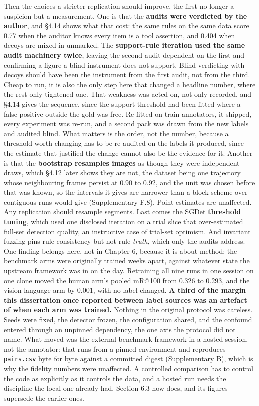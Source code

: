 Then the choices a stricter replication should improve, the first no longer a suspicion but a measurement. One is that the \textbf{audits were verdicted by the author}, and \S{}4.14 shows what that cost: the same rules on the same data score 0.77 when the auditor knows every item is a tool assertion, and 0.404 when decoys are mixed in unmarked. The \textbf{support-rule iteration used the same audit machinery twice}, leaving the second audit dependent on the first and confirming a figure a blind instrument does not support. Blind verdicting with decoys should have been the instrument from the first audit, not from the third. Cheap to run, it is also the only step here that changed a headline number, where the rest only tightened one. That weakness was acted on, not only recorded, and \S{}4.14 gives the sequence, since the support threshold had been fitted where a false positive outside the gold was free. Re-fitted on train annotators, it shipped, every experiment was re-run, and a second pack was drawn from the new labels and audited blind. What matters is the order, not the number, because a threshold worth changing has to be re-audited on the labels it produced, since the estimate that justified the change cannot also be the evidence for it. Another is that the \textbf{bootstrap resamples images} as though they were independent draws, which \S{}4.12 later shows they are not, the dataset being one trajectory whose neighbouring frames persist at 0.90 to 0.92, and the unit was chosen before that was known, so the intervals it gives are narrower than a block scheme over contiguous runs would give (Supplementary F.8). Point estimates are unaffected. Any replication should resample segments. Last comes the SGDet \textbf{threshold tuning}, which used one disclosed iteration on a trial slice that over-estimated full-set detection quality, an instructive case of trial-set optimism. And invariant fuzzing pins rule consistency but not rule \textit{truth}, which only the audits address. One finding belongs here, not in Chapter 6, because it is about method: the benchmark arms were originally trained weeks apart, against whatever state the upstream framework was in on the day. Retraining all nine runs in one session on one clone moved the human arm's pooled mR@100 from 0.326 to 0.293, and the vision-language arm by 0.001, with no label changed. \textbf{A third of the margin this dissertation once reported between label sources was an artefact of when each arm was trained.} Nothing in the original protocol was careless. Seeds were fixed, the detector frozen, the configuration shared, and the confound entered through an unpinned dependency, the one axis the protocol did not name. What moved was the external benchmark framework in a hosted session, not the annotator: that runs from a pinned environment and reproduces \texttt{pairs.csv} byte for byte against a committed digest (Supplementary B), which is why the fidelity numbers were unaffected. A controlled comparison has to control the code as explicitly as it controls the data, and a hosted run needs the discipline the local one already had. Section 6.3 now does, and its figures supersede the earlier ones.

